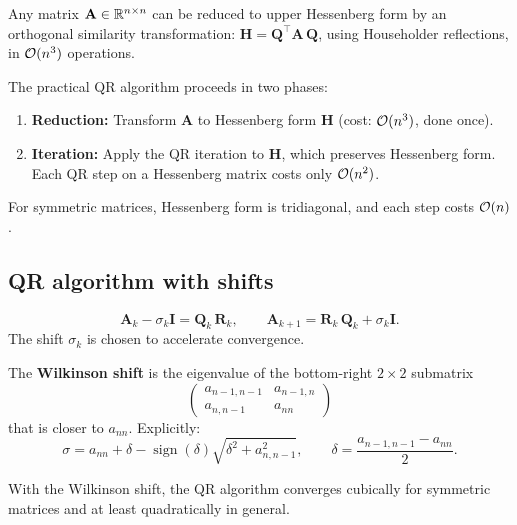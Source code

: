 \begin{theorem}
\label{thm:hessenberg}
Any matrix $\mathbf{A} \in \mathbb{R}^{n \times n}$ can be reduced to upper Hessenberg form by an orthogonal similarity transformation: $\mathbf{H} = \mathbf{Q}^\top\mathbf{A}\,\mathbf{Q}$, using Householder reflections, in $\mathcal{O}(n^3)$ operations.
\end{theorem}

\begin{method}
The practical QR algorithm proceeds in two phases:
\begin{enumerate}
    \item \textbf{Reduction:} Transform $\mathbf{A}$ to Hessenberg form $\mathbf{H}$ (cost: $\mathcal{O}(n^3)$, done once).
    \item \textbf{Iteration:} Apply the QR iteration to $\mathbf{H}$, which preserves Hessenberg form. Each QR step on a Hessenberg matrix costs only $\mathcal{O}(n^2)$.
\end{enumerate}
For symmetric matrices, Hessenberg form is tridiagonal, and each step costs $\mathcal{O}(n)$.
\end{method}

\subsection{QR algorithm with shifts}

\begin{definition}
\label{def:shifted-qr}
\[
    \mathbf{A}_k - \sigma_k \mathbf{I} = \mathbf{Q}_k\,\mathbf{R}_k, \qquad
    \mathbf{A}_{k+1} = \mathbf{R}_k\,\mathbf{Q}_k + \sigma_k \mathbf{I}.
\]
The shift $\sigma_k$ is chosen to accelerate convergence.
\end{definition}

\begin{definition}
\label{def:wilkinson-shift}
The \textbf{Wilkinson shift} is the eigenvalue of the bottom-right $2 \times 2$ submatrix
\[
    \begin{pmatrix} a_{n-1,n-1} & a_{n-1,n} \\ a_{n,n-1} & a_{nn} \end{pmatrix}
\]
that is closer to $a_{nn}$. Explicitly:
\[
    \sigma = a_{nn} + \delta - \operatorname{sign}(\delta)\sqrt{\delta^2 + a_{n,n-1}^2}, \qquad \delta = \frac{a_{n-1,n-1} - a_{nn}}{2}.
\]
\end{definition}

\begin{theorem}
With the Wilkinson shift, the QR algorithm converges cubically for symmetric matrices and at least quadratically in general.
\end{theorem}


